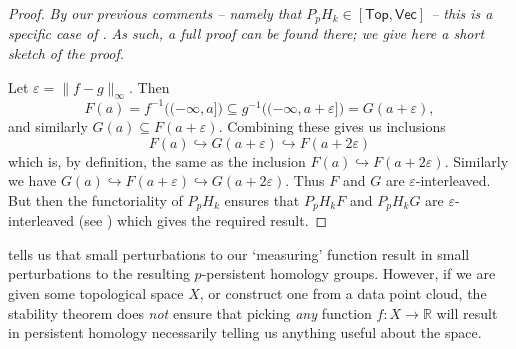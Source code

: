 \documentclass[12pt]{article}
\numberwithin{equation}{subsection}
\numberwithin{theorem}{subsection}
\numberwithin{lemma}{subsection}
\numberwithin{corollary}{subsection}
\numberwithin{definition}{subsection}
\numberwithin{example}{subsection}
\numberwithin{note}{subsection}
\newcommand{\rr}{\mathbb{R}}
\newcommand{\Top}{\mathsf{Top}}
\newcommand{\vare}{\varepsilon}
\begin{document}
            \begin{proof}
                \emph{By our previous comments -- namely that $P_pH_k\in[\Top,\mathsf{Vec}]$ -- this is a specific case of \cite[Theorem~5.1]{Bubenik:dn}.}
                \emph{As such, a full proof can be found there; we give here a short sketch of the proof.}

                Let $\vare=\|f-g\|_\infty$.
                Then
                \begin{equation*}
                    F(a) = f^{-1}\big((-\infty,a]\big) \subseteq g^{-1}\big((-\infty,a+\vare]\big) = G(a+\vare),
                \end{equation*}
                and similarly $G(a)\subseteq F(a+\vare)$.
                Combining these gives us inclusions
                \begin{equation*}
                    F(a)\hookrightarrow G(a+\vare)\hookrightarrow F(a+2\vare)
                \end{equation*}
                which is, by definition, the same as the inclusion $F(a)\hookrightarrow F(a+2\vare)$.
                Similarly we have $G(a)\hookrightarrow F(a+\vare)\hookrightarrow G(a+2\vare)$.
                Thus $F$ and $G$ are $\vare$-interleaved.
                But then the functoriality of $P_pH_k$ ensures that $P_pH_kF$ and $P_pH_kG$ are $\vare$-interleaved (see \cite[Proposition~3.6]{Bubenik:dn}) which gives the required result.
            \end{proof}

             tells us that small perturbations to our `measuring' function result in small perturbations to the resulting $p$-persistent homology groups.
            However, if we are given some topological space $X$, or construct one from a data point cloud, the stability theorem does \emph{not} ensure that picking \emph{any} function $f\colon X\to\rr$ will result in persistent homology necessarily telling us anything useful about the space.
\end{document}
